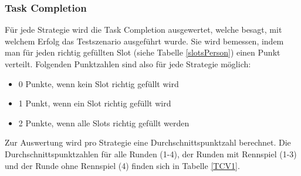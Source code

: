 \documentclass[12pt,a4paper]{scrartcl}
\begin{document}

\subsubsection{Task Completion}
\label{tcausw1}
Für jede Strategie wird die Task Completion ausgewertet, welche besagt, mit welchem Erfolg das Testszenario ausgeführt wurde. Sie wird bemessen, indem man für jeden richtig gefüllten Slot (siehe Tabelle \ref{slotsPerson}) einen Punkt verteilt. Folgenden Punktzahlen sind also für jede Strategie möglich:
\begin{itemize}
\item 0 Punkte, wenn kein Slot richtig gefüllt wird
\item 1 Punkt, wenn ein Slot richtig gefüllt wird
\item 2 Punkte, wenn alle Slots richtig gefüllt werden
\end{itemize}
Zur Auswertung wird pro Strategie eine Durchschnittspunktzahl berechnet. Die Durchschnittspunktzahlen für alle Runden (1-4), der Runden mit Rennspiel (1-3) und der Runde ohne Rennspiel (4) finden sich in Tabelle \ref{TCV1}.
\newpage
\end{document}
